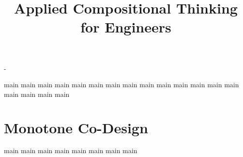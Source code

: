

\pagestyle{scrheadings} -

 \ohead{\pagemark}
 \ihead{\headmark}
 \cfoot{}
\dominitoc
\doparttoc
\setcounter{parttocdepth}{0}
\setcounter{minitocdepth}{1}

\title{Applied Compositional Thinking\\ for Engineers}
\date{}



\setcounter{tocdepth}{1}
\tableofcontents


{main}
{main}
{main}
{main}
{main}
{main}
{main}
{main}
{main}
{main}
{main}
{main}
{main}
{main}
{main}
{main}
{main}
{main}



\part{Monotone Co-Design}\label{part:co-design}

{main}
{main}
{main}
{main}
{main}
{main}
{main}
{main}




